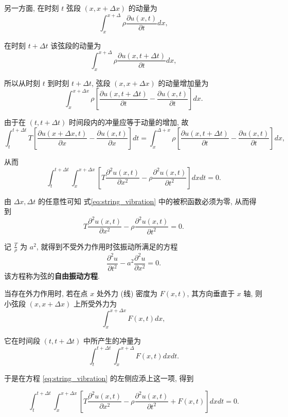 另一方面, 在时刻 $t$ 弦段 $(x, x+\Delta x)$ 的动量为
$$
\int_x^{x+\Delta} \rho \frac{\partial u(x, t)}{\partial t} d x,
$$

在时刻 $t+\Delta t$ 该弦段的动量为
$$
\int_x^{x+\Delta} \rho \frac{\partial u(x, t+\Delta t)}{\partial t} d x,
$$

所以从时刻 $t$ 到时刻 $t+\Delta t$, 弦段 $(x, x+\Delta x)$ 的动量增加量为
$$
\int_x^{x+\Delta x} \rho\left[\frac{\partial u(x, t+\Delta t)}{\partial t}-\frac{\partial u(x, t)}{\partial t}\right] d x .
$$

由于在 $(t, t+\Delta t)$ 时间段内的冲量应等于动量的增加, 故
$$
\int_t^{t+\Delta t} T\left[\frac{\partial 
u(x+\Delta x, t)}{\partial x}-\frac{\partial u(x, t)}{\partial x}\right] d t
=\int_{x}^{\Delta+x} \rho\left[\frac{\partial u(x, t+\Delta t)}{\partial t}-
\frac{\partial u(x, t)}{\partial t}\right] d x,
$$

从而
\begin{equation}
\int_t^{t+\Delta t} \int_{x}^{x+ \Delta x} 
\left[T \frac{\partial^2 u(x, t)}{\partial x^2}-\rho 
\frac{\partial^2 u(x, t)}{\partial t^2}\right] d x d t=0 .
\label{eq:string_vibration}
\end{equation}

由 $\Delta x, \Delta t$ 的任意性可知 式\ref{eq:string_vibration} 中的被积函数必须为零, 从而得到
\begin{equation}
T \frac{\partial^2 u(x, t)}{\partial x^2}-\rho \frac{\partial^2 u(x, t)}{\partial t^2}=0 .
\end{equation}


记 $\frac{T}{\rho}$ 为 $a^2$, 就得到不受外力作用时弦振动所满足的方程
\begin{equation}
\frac{\partial^2 u}{\partial t^2}-a^2 \frac{\partial^2 u}{\partial x^2}=0 .
\label{eq:free_vibration}
\end{equation}
该方程称为弦的\textbf{自由振动方程}.

当存在外力作用时, 若在点 $x$ 处外力 (线) 密度为 $F(x, t)$, 其方向垂直于 $x$ 轴, 则小弦段 $(x, x+\Delta x)$ 上所受外力为
$$
\int_x^{x+\Delta x} F(x, t) d x,
$$

它在时间段 $(t, t+\Delta t)$ 中所产生的冲量为
$$
\int_t^{t+\Delta t} \int_x^{x+\Delta } F(x, t) d x d t .
$$

于是在方程 \ref{eq:string_vibration} 的左侧应添上这一项, 得到

$$
\int_t^{t+\Delta t} \int_{x}^{x+ \Delta x}  \left[T \frac{\partial^2 u(x, t)}{\partial x^2}-\rho \frac{\partial^2 u(x, t)}{\partial t^2}+F(x, t)\right] d x d t=0 .
$$

